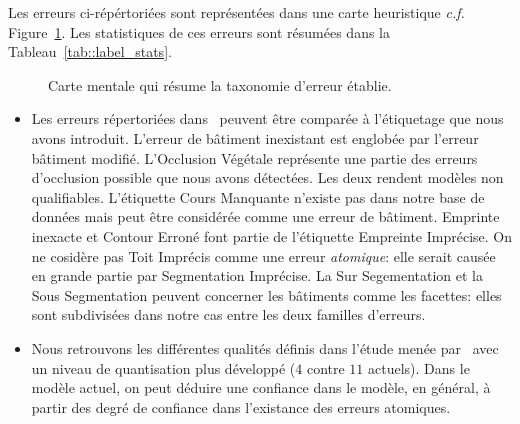 \documentclass[a4paper,french]{article}
\begin{document}
    Les erreurs ci-répértoriées sont représentées dans une carte heuristique \textit{c.f.} Figure~\ref{fig::mindmap_errors}. Les statistiques de ces erreurs sont résumées dans la Tableau~\ref{tab::label_stats}.


    \begin{figure}[H]
        \begin{center}
            
            \caption{\label{fig::mindmap_errors} Carte mentale qui résume la taxonomie d'erreur établie.}
        \end{center}
    \end{figure}

    \begin{itemize}
        \item Les erreurs répertoriées dans~\cite{Michelin2013} peuvent être comparée à l'étiquetage que nous avons introduit. L'erreur de bâtiment inexistant est englobée par l'erreur bâtiment modifié. L'Occlusion Végétale représente une partie des erreurs d'occlusion possible que nous avons détectées. Les deux rendent modèles non qualifiables. L'étiquette Cours Manquante n'existe pas dans notre base de données mais peut être considérée comme une erreur de bâtiment. Emprinte inexacte et Contour Erroné font partie de l'étiquette Empreinte Imprécise. On ne cosidère pas Toit Imprécis comme une erreur \emph{atomique}: elle serait causée en grande partie par Segmentation Imprécise. La Sur Segementation et la Sous Segmentation peuvent concerner les bâtiments comme les facettes: elles sont subdivisées dans notre cas entre les deux familles d'erreurs.
        \item Nous retrouvons les différentes qualités définis dans l'étude menée par~\cite{Boudet2006} avec un niveau de quantisation plus développé ($4$ contre $11$ actuels). Dans le modèle actuel, on peut déduire une confiance dans le modèle, en général, à partir des degré de confiance dans l'existance des erreurs atomiques.
    \end{itemize}
\end{document}
